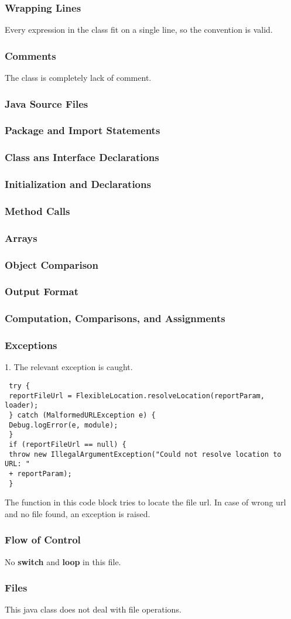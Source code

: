 \documentclass{article}
\begin{document}
\subsubsection{Wrapping Lines}
Every expression in the class fit on a single line, so the convention is valid.
\subsubsection{Comments}
The class is completely lack of comment.
 \subsubsection{Java Source Files}
 \subsubsection{Package and Import Statements}
 \subsubsection{Class ans Interface Declarations}
 \subsubsection{Initialization and Declarations}
 \subsubsection{Method Calls}
 \subsubsection{Arrays}
 \subsubsection{Object Comparison}
 \subsubsection{Output Format}
 \subsubsection{Computation, Comparisons, and Assignments}
 \subsubsection{Exceptions}
 1. The relevant exception is caught. 
 \begin{verbatim}
 try {
 reportFileUrl = FlexibleLocation.resolveLocation(reportParam, loader);
 } catch (MalformedURLException e) {
 Debug.logError(e, module);
 }
 if (reportFileUrl == null) {
 throw new IllegalArgumentException("Could not resolve location to URL: " 
 + reportParam);
 }
 \end{verbatim}
 The function in this code block tries to locate the file url. In case of wrong url and no file found, an exception is raised.
 \subsubsection{Flow of Control}
 No \textbf{switch} and \textbf{loop} in this file.
 \subsubsection{Files}
 This java class does not deal with file operations. 
\end{document}
